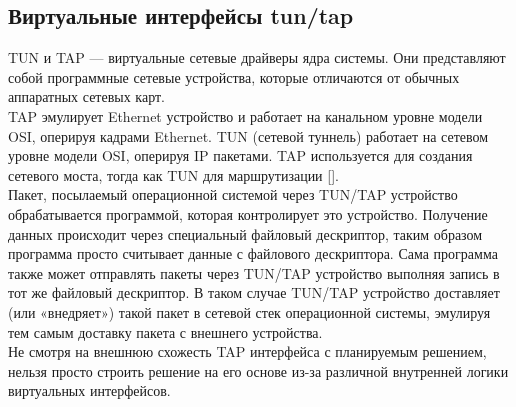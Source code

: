 \documentclass[14pt, a4paper]{extarticle}
\begin{document}
\subsection{Виртуальные интерфейсы tun/tap}
TUN и TAP — виртуальные сетевые драйверы ядра системы. Они представляют собой программные сетевые устройства, которые отличаются от обычных аппаратных сетевых карт. \\
\indent TAP эмулирует Ethernet устройство и работает на канальном уровне модели OSI, оперируя кадрами Ethernet. TUN (сетевой туннель) работает на сетевом уровне модели OSI, оперируя IP пакетами. TAP используется для создания сетевого моста, тогда как TUN для маршрутизации [\cite{tuntap}]. \\
\indent Пакет, посылаемый операционной системой через TUN/TAP устройство обрабатывается программой, которая контролирует это устройство. Получение данных происходит через специальный файловый дескриптор, таким образом программа просто считывает данные с файлового дескриптора. Сама программа также может отправлять пакеты через TUN/TAP устройство выполняя запись в тот же файловый дескриптор. В таком случае TUN/TAP устройство доставляет (или «внедряет») такой пакет в сетевой стек операционной системы, эмулируя тем самым доставку пакета с внешнего устройства. \\
\indent Не смотря на внешнюю схожесть TAP интерфейса с планируемым решением, нельзя просто строить решение на его основе из-за различной внутренней логики виртуальных интерфейсов.
\end{document}
